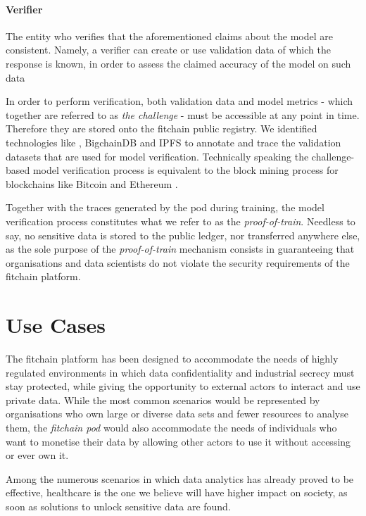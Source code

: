 \documentclass[12pt, a4paper,titlepage]{extreport}
\begin{document}
\paragraph{Verifier}  The entity who verifies that the aforementioned claims about the model are consistent. Namely, a verifier can create or use validation data of which the response is known, in order to assess the claimed accuracy of the model on such data

In order to perform verification, both validation data and model metrics - which together are referred to as \textit{the challenge} - must be accessible at any point in time. Therefore they are stored onto the fitchain public registry. We identified technologies like \cite{oceanprotocol}, BigchainDB \cite{bigchaindb} and IPFS \cite{ipfs} to annotate and trace the validation datasets that are used for model verification.
Technically speaking the challenge-based model verification process is equivalent to the block mining process for blockchains like Bitcoin \cite{bitcoin} and Ethereum \cite{ethereum}.
 
Together with the traces generated by the pod during training, the model verification process constitutes what we refer to as the \textit{proof-of-train}. 
Needless to say, no sensitive data is stored to the public ledger, nor transferred anywhere else, as the sole purpose of the \textit{proof-of-train} mechanism consists in guaranteeing that organisations and data scientists do not violate the security requirements of the fitchain platform.


\section{Use Cases}
The fitchain platform has been designed to accommodate the needs of highly regulated environments in which data confidentiality and industrial secrecy must stay protected, while giving the opportunity to external actors to interact and use private data. While the most common scenarios would be represented by organisations who own large or diverse data sets and fewer resources to analyse them, the \textit{fitchain pod} would also accommodate the needs of individuals who want to  monetise their data by allowing other actors to use it without accessing or ever own it. 

Among the numerous scenarios in which data analytics has already proved to be effective, healthcare is the one we believe will have higher impact on society, as soon as solutions to unlock sensitive data are found. 
\end{document}
